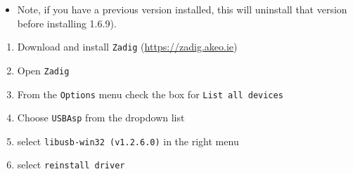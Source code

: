 \documentclass[
]{article}
\providecommand{\tightlist}{%
  \setlength{\itemsep}{0pt}\setlength{\parskip}{0pt}}
\begin{document}
\begin{itemize}
\tightlist
\item
  Note, if you have a previous version installed, this will uninstall
  that version before installing 1.6.9).
\end{itemize}

\begin{enumerate}
\def\labelenumi{\arabic{enumi}.}
\setcounter{enumi}{1}
\tightlist
\item
  Download and install \texttt{Zadig} (\url{https://zadig.akeo.ie})
\item
  Open \texttt{Zadig}
\item
  From the \texttt{Options} menu check the box for
  \texttt{List\ all\ devices}
\item
  Choose \texttt{USBAsp} from the dropdown list
\item
  select \texttt{libusb-win32\ (v1.2.6.0)} in the right menu
\item
  select \texttt{reinstall\ driver}
\end{enumerate}
\end{document}
